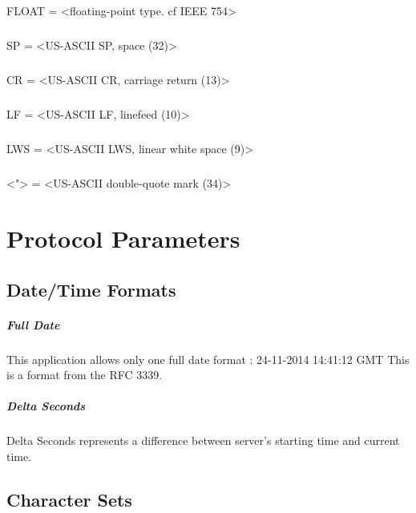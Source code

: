     \paragraph{}
FLOAT          = <floating-point type. cf IEEE 754>
    \paragraph{}
SP             = <US-ASCII SP, space (32)>
    \paragraph{}
CR             = <US-ASCII CR, carriage return (13)>
    \paragraph{}
LF             = <US-ASCII LF, linefeed (10)>
    \paragraph{}
LWS            = <US-ASCII LWS, linear white space (9)>
    \paragraph{}
<">            = <US-ASCII double-quote mark (34)>


    \clearpage
\chapter{Protocol Parameters}
    \section{Date/Time Formats}
        \paragraph{Full Date}
This application allows only one full date format :
    24-11-2014 14:41:12 GMT
This is a format from the RFC 3339.
        \paragraph{Delta Seconds}
Delta Seconds represents a difference between server's starting
time and current time.
    \section{Character Sets}
